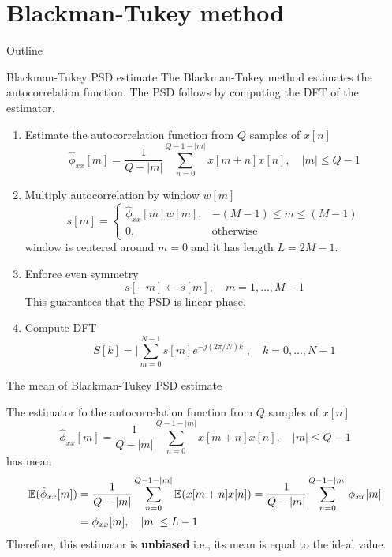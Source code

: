 \documentclass[10pt]{beamer}
\begin{document}
\section{Blackman-Tukey method}
\begin{frame}{Outline}
\tableofcontents[currentsection]
\end{frame}

%
\begin{frame}{Blackman-Tukey PSD estimate}
	The Blackman-Tukey method estimates the autocorrelation function. The PSD follows by computing the DFT of the estimator.
	\begin{enumerate}
		\item Estimate the autocorrelation function from $Q$ samples of $x[n]$
		\begin{equation*}
			\hat{\phi}_{xx}[m] = \frac{1}{Q-|m|}\sum_{n = 0}^{Q-1-|m|} x[m+n]x[n], \quad |m|\leq Q-1
		\end{equation*}
		\item Multiply autocorrelation by window $w[m]$
		\begin{equation*}
			s[m] = \begin{cases}
			\hat{\phi}_{xx}[m]w[m], & -(M-1)\leq m \leq (M-1) \\
			0, & \text{otherwise}
			\end{cases}
		\end{equation*}
		window is centered around $m = 0$ and it has length $L = 2M-1$.
		\item Enforce even symmetry
		\begin{equation*}
			s[-m] \gets s[m], \quad m = 1, \ldots, M-1
		\end{equation*}	
		This guarantees that the PSD is linear phase.
		\item Compute DFT
		\begin{equation*}
			S[k] = \bigg|\sum_{m = 0}^{N-1}s[m]e^{-j(2\pi/N)k}\bigg|, \quad k = 0, \ldots, N-1
		\end{equation*}
	\end{enumerate}
\end{frame}

%
\begin{frame}{The mean of Blackman-Tukey PSD estimate}

The estimator fo the autocorrelation function from $Q$ samples of $x[n]$
\begin{equation*}
\hat{\phi}_{xx}[m] = \frac{1}{Q-|m|}\sum_{n = 0}^{Q-1-|m|} x[m+n]x[n], \quad |m|\leq Q-1
\end{equation*}
has mean
\begin{align*}
\operatorname{\mathbb{E}}(\hat{\phi}_{xx}[m]) &= \frac{1}{Q-|m|}\sum_{n=0}^{Q-1-|m|} \operatorname{\mathbb{E}}(x[m+n]x[n]) = \frac{1}{Q-|m|}\sum_{n=0}^{Q-1-|m|}\phi_{xx}[m] \\
&=\phi_{xx}[m], \quad |m|\leq L-1
\end{align*}
Therefore, this estimator is \textbf{unbiased} i.e., its mean is equal to the ideal value.
\end{frame}
\end{document}

